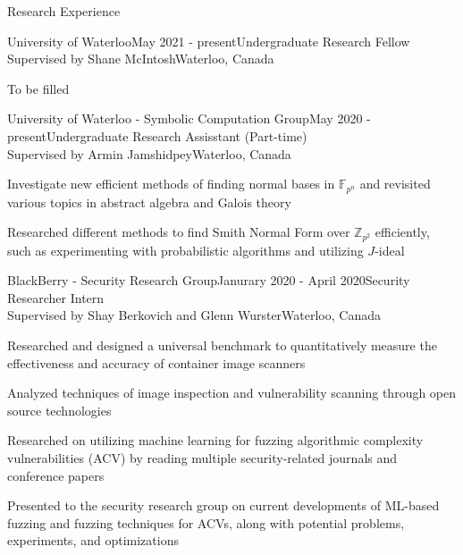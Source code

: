 \documentclass{cv}
\begin{document}
\begin{rSection}{Research Experience}
\begin{rSubsection}{University of Waterloo}{May 2021 - present}{Undergraduate Research Fellow \\ Supervised by Shane McIntosh}{Waterloo, Canada}
	\item To be filled
\end{rSubsection}

\begin{rSubsection}{University of Waterloo - Symbolic Computation Group}{May 2020 - present}{Undergraduate Research Assisstant (Part-time)\\ Supervised by Armin Jamshidpey}{Waterloo, Canada}
  	\item Investigate new efficient methods of finding normal bases in $\mathbb{F}_{p^n}$ and revisited various topics in abstract algebra and Galois theory\item Researched different methods to find Smith Normal Form over $\mathbb{Z}_{p^2}$ efficiently, such as experimenting with probabilistic algorithms and utilizing $J$-ideal
\end{rSubsection}

\begin{rSubsection}{BlackBerry - Security Research Group}{Janurary 2020 - April 2020}{Security Researcher Intern \\ Supervised by Shay Berkovich and Glenn Wurster}{Waterloo, Canada}
	\item Researched and designed a universal benchmark to quantitatively measure the effectiveness and accuracy of container image scanners
	\item Analyzed techniques of image inspection and vulnerability scanning through open source technologies
	\item Researched on utilizing machine learning for fuzzing algorithmic complexity vulnerabilities (ACV) by reading multiple security-related journals and conference papers
	\item Presented to the security research group on current developments of ML-based fuzzing and fuzzing techniques for ACVs, along with potential problems, experiments, and optimizations
\end{rSubsection}
\end{rSection}
\end{document}
